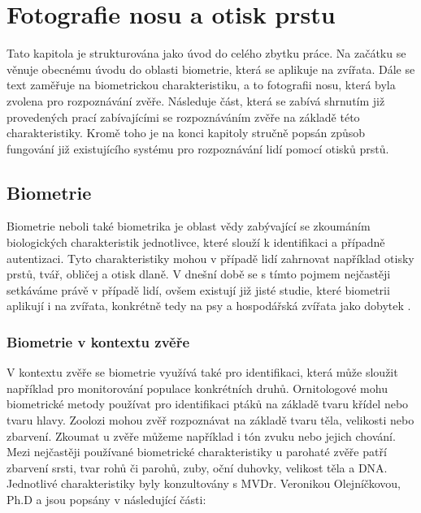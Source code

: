 \chapter{Fotografie nosu a otisk prstu}

Tato kapitola je strukturována jako úvod do celého zbytku práce. Na začátku se věnuje obecnému úvodu do oblasti biometrie, která se aplikuje na zvířata. Dále se text zaměřuje na biometrickou charakteristiku, a to fotografii nosu, která byla zvolena pro rozpoznávání zvěře. Následuje část, která se zabívá shrnutím již provedených prací zabívajícími se rozpoznáváním zvěře na základě této charakteristiky. Kromě toho je na konci kapitoly stručně popsán způsob fungování již existujícího systému pro rozpoznávání lidí pomocí otisků prstů.


\section{Biometrie}
\label{Biometrie}

Biometrie neboli také biometrika je oblast vědy zabývající se zkoumáním biologických charakteristik jednotlivce, které slouží k identifikaci a případně autentizaci. Tyto charakteristiky mohou v případě lidí zahrnovat například otisky prstů, tvář, obličej a otisk dlaně. V dnešní době se s tímto pojmem nejčastěji setkáváme právě v případě lidí, ovšem existují již jisté studie, které biometrii aplikují i na zvířata, konkrétně tedy na psy \cite{psi} a hospodářská zvířata jako dobytek \cite{dobytek}.

\subsection{Biometrie v kontextu zvěře}
\label{Biometrie v kontextu zvěře}

V kontextu zvěře se biometrie využívá také pro identifikaci, která může sloužit například pro monitorování populace konkrétních druhů. Ornitologové mohu biometrické metody používat pro identifikaci ptáků na základě tvaru křídel nebo tvaru hlavy. Zoolozi mohou zvěř rozpoznávat na základě tvaru těla, velikosti nebo zbarvení. Zkoumat u zvěře můžeme například i tón zvuku nebo jejich chování. Mezi nejčastěji používané biometrické charakteristiky u parohaté zvěře patří zbarvení srsti, tvar rohů či parohů, zuby, oční duhovky, velikost těla a DNA. Jednotlivé charakteristiky byly konzultovány s MVDr. Veronikou Olejníčkovou, Ph.D a jsou popsány v následující části:

